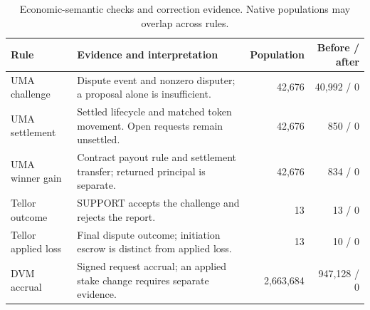 \begin{table}[!htbp]
\centering\tabstyle
\caption{Economic-semantic checks and correction evidence. Native populations may overlap across rules.}
\label{tab:semantic_repair}
\begin{tabularx}{\linewidth}{@{}L{.19\linewidth}Yrr@{}}
\toprule
Rule & Evidence and interpretation & Population & Before / after \\
\midrule
UMA challenge & Dispute event and nonzero disputer; a proposal alone is insufficient. & 42,676 & 40,992 / 0 \\
UMA settlement & Settled lifecycle and matched token movement. Open requests remain unsettled. & 42,676 & 850 / 0 \\
UMA winner gain & Contract payout rule and settlement transfer; returned principal is separate. & 42,676 & 834 / 0 \\
Tellor outcome & SUPPORT accepts the challenge and rejects the report. & 13 & 13 / 0 \\
Tellor applied loss & Final dispute outcome; initiation escrow is distinct from applied loss. & 13 & 10 / 0 \\
DVM accrual & Signed request accrual; an applied stake change requires separate evidence. & 2,663,684 & 947,128 / 0 \\
\bottomrule
\end{tabularx}
\end{table}
